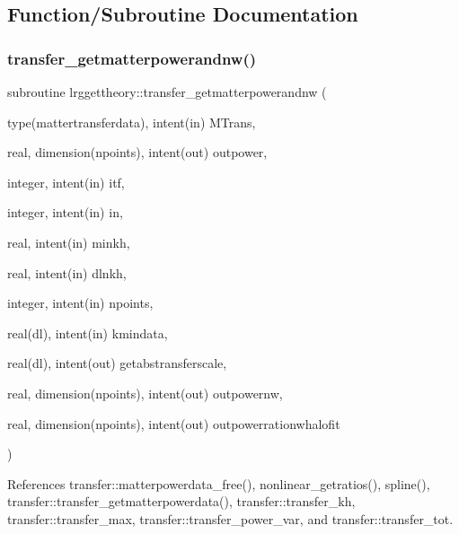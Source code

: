 \subsection{Function/\+Subroutine Documentation}
\mbox{\label{namespacelrggettheory_abd8f5f818ab0125d9088ce80da0ca469}} 
\subsubsection{\texorpdfstring{transfer\+\_\+getmatterpowerandnw()}{transfer\_getmatterpowerandnw()}}
{\footnotesize\ttfamily subroutine lrggettheory\+::transfer\+\_\+getmatterpowerandnw (\begin{DoxyParamCaption}\item[{type(mattertransferdata), intent(in)}]{M\+Trans,  }\item[{real, dimension(npoints), intent(out)}]{outpower,  }\item[{integer, intent(in)}]{itf,  }\item[{integer, intent(in)}]{in,  }\item[{real, intent(in)}]{minkh,  }\item[{real, intent(in)}]{dlnkh,  }\item[{integer, intent(in)}]{npoints,  }\item[{real(dl), intent(in)}]{kmindata,  }\item[{real(dl), intent(out)}]{getabstransferscale,  }\item[{real, dimension(npoints), intent(out)}]{outpowernw,  }\item[{real, dimension(npoints), intent(out)}]{outpowerrationwhalofit }\end{DoxyParamCaption})}



References transfer\+::matterpowerdata\+\_\+free(), nonlinear\+\_\+getratios(), spline(), transfer\+::transfer\+\_\+getmatterpowerdata(), transfer\+::transfer\+\_\+kh, transfer\+::transfer\+\_\+max, transfer\+::transfer\+\_\+power\+\_\+var, and transfer\+::transfer\+\_\+tot.

